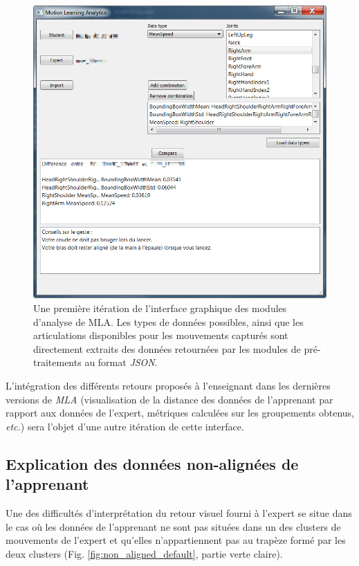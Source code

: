 \begin{figure}[h]
    \centering
    \includegraphics[width=\textwidth]{pictures/MLA_GUI_mockup.png}
    \caption[Une première itération de l'interface graphique des modules d'analyse de MLA]{Une première itération de l'interface graphique des modules d'analyse de MLA. Les types de données possibles, ainsi que les articulations disponibles pour les mouvements capturés sont directement extraits des données retournées par les modules de pré-traitements au format \textit{JSON}.}
    \label{fig:MLA_GUI_mockup}
\end{figure}

L'intégration des différents retours proposés à l'enseignant dans les dernières versions de \textit{MLA} (visualisation de la distance des données de l'apprenant par rapport aux données de l'expert, métriques calculées sur les groupements obtenus, \textit{etc.}) sera l'objet d'une autre itération de cette interface.

\subsection{Explication des données non-alignées de l'apprenant}
Une des difficultés d'interprétation du retour visuel fourni à l'expert se situe dans le cas où les données de l'apprenant ne sont pas situées dans un des clusters de mouvements de l'expert et qu'elles n'appartiennent pas au trapèze formé par les deux clusters (Fig. \ref{fig:non_aligned_default}, partie verte claire).


